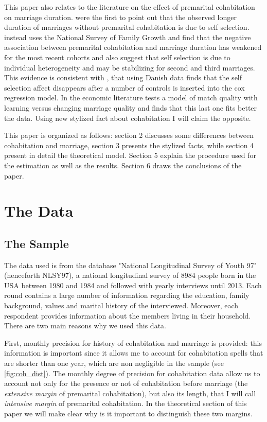\documentclass[12pt]{article}
\begin{document}
This paper also relates to the literature on the effect of premarital cohabitation on marriage duration. \citet{lillard1995} were the first to point out that the observed longer duration of marriages without premarital cohabitation is due to self selection.  \citet{reinhold2010} instead uses the National Survey of Family Growth and find that the negative association between premarital cohabitation and marriage duration has weakened for the most recent cohorts and also suggest that self selection is due to individual heterogeneity and may be stabilizing for second and third marriages. This evidence is consistent with  \citet{svarer2004}, that using Danish data finds that the self selection affect disappears after a number of controls is inserted into the cox regression model. In the economic literature \citet{marinescu2016} tests a model of match quality with learning versus changing marriage quality and finds that this last one fits better the data. Using new stylized fact about cohabitation I will claim the opposite.

This paper is organized as follows: section 2 discusses some differences between cohabitation and marriage, section 3 presents the stylized facts, while section 4 present in detail the theoretical model. Section 5 explain the procedure used for the estimation as well as the results. Section 6 draws the conclusions of the paper.

\newpage

\section{The Data}
\subsection{The Sample}
 The data used is from the database "National Longitudinal Survey of Youth 97" (henceforth NLSY97), a national longitudinal survey of 8984 people born in the USA between 1980 and 1984 and followed with yearly interviews until 2013. Each round contains a large number of information regarding the education, family background, values and marital history of the interviewed. Moreover, each respondent provides information about the members living in their household. There are two main reasons why we used this data. 
 
 First, monthly precision for history of cohabitation and marriage is provided: this information is important since it allows me to account for cohabitation spells that are shorter than one year, which are non negligible in the sample (see \autoref{fig:coh_dist}). The monthly degree of precision for cohabitation data allow us to account not only for the presence or not of cohabitation before marriage (the \textit{extensive margin} of premarital cohabitation), but also its length, that I will call \textit{intensive margin} of premarital cohabitation. In the theoretical section of this paper we will make clear why  is it important to distinguish these two margins. 
 
\end{document}
